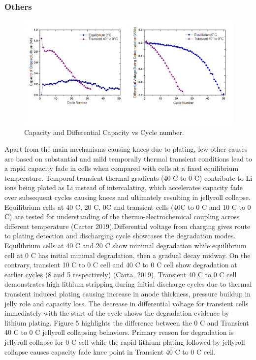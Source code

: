 \documentclass{article}
\begin{document}
\subsubsection{Others}

\begin{figure}[ht]
\centering
\includegraphics[scale = 0.7]{images/Capacity & Diff Voltage.png}
\caption{Capacity and Differential Capacity vs Cycle number.}
\label{fig:knee_definition}
\end{figure}

Apart from the main mechanisms causing knees due to plating, few other causes are based on substantial and mild temporally thermal transient conditions lead to a rapid capacity fade in cells when compared with cells at a fixed equilibrium temperature. Temporal transient thermal gradients (40 \degree C to 0 \degree C) contribute to Li ions being plated as Li instead of intercalating, which accelerates capacity fade over subsequent cycles causing knees and ultimately resulting in jellyroll collapse.
Equilibrium cells at 40 \degree C, 20 \degree C, 0\degree C and transient cells (40\degree C to 0 \degree C and 10 \degree C to 0 \degree C) are tested for understanding of the thermo-electrochemical coupling across different temperature (Carter 2019).Differential voltage from charging gives route to plating detection and discharging cycle showcases the degradation modes. Equilibrium cells at 40 \degree C and 20 \degree C show minimal degradation while equilibrium cell at 0 \degree C has initial minimal degradation, then a gradual decay midway. On the contrary, transient 10 \degree C to 0 \degree C cell and 40 \degree C to 0 \degree C cell show degradation at earlier cycles (8 and 5 respectively) (Carta, 2019). Transient 40 \degree C to 0 \degree C cell demonstrates high lithium stripping during initial discharge cycles due to thermal transient induced plating causing increase in anode thickness, pressure buildup in jelly role and capacity loss. The decrease in differential voltage for transient cells immediately with the start of the cycle shows the degradation evidence by lithium plating.  Figure 5 highlights the difference between the 0 \degree C and Transient 40 \degree C to 0 \degree C jellyroll collapsing behaviors. Primary reason for degradation is jellyroll collapse for 0 \degree C cell while the rapid lithium plating followed by jellyroll collapse causes capacity fade knee point in Transient 40 \degree C to 0 \degree C cell. 
\end{document}
